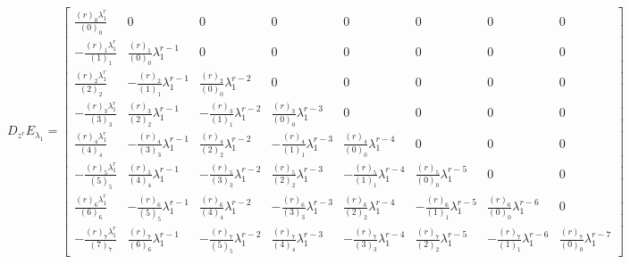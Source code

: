 \iffalse %
\begin{displaymath}
D_{{z}^{r}}E_{\lambda_{1}} = \left[\begin{matrix}\frac{{\left(r\right)}_{0} \lambda_{1}^{r}}{{\left(0\right)}_{0}} & 0 & 0 & 0 & 0 & 0 & 0 & 0\\- \frac{{\left(r\right)}_{1} \lambda_{1}^{r}}{{\left(1\right)}_{1}} & \frac{{\left(r\right)}_{1}}{{\left(0\right)}_{0}} \lambda_{1}^{r - 1} & 0 & 0 & 0 & 0 & 0 & 0\\\frac{{\left(r\right)}_{2} \lambda_{1}^{r}}{{\left(2\right)}_{2}} & - \frac{{\left(r\right)}_{2}}{{\left(1\right)}_{1}} \lambda_{1}^{r - 1} & \frac{{\left(r\right)}_{2}}{{\left(0\right)}_{0}} \lambda_{1}^{r - 2} & 0 & 0 & 0 & 0 & 0\\- \frac{{\left(r\right)}_{3} \lambda_{1}^{r}}{{\left(3\right)}_{3}} & \frac{{\left(r\right)}_{3}}{{\left(2\right)}_{2}} \lambda_{1}^{r - 1} & - \frac{{\left(r\right)}_{3}}{{\left(1\right)}_{1}} \lambda_{1}^{r - 2} & \frac{{\left(r\right)}_{3}}{{\left(0\right)}_{0}} \lambda_{1}^{r - 3} & 0 & 0 & 0 & 0\\\frac{{\left(r\right)}_{4} \lambda_{1}^{r}}{{\left(4\right)}_{4}} & - \frac{{\left(r\right)}_{4}}{{\left(3\right)}_{3}} \lambda_{1}^{r - 1} & \frac{{\left(r\right)}_{4}}{{\left(2\right)}_{2}} \lambda_{1}^{r - 2} & - \frac{{\left(r\right)}_{4}}{{\left(1\right)}_{1}} \lambda_{1}^{r - 3} & \frac{{\left(r\right)}_{4}}{{\left(0\right)}_{0}} \lambda_{1}^{r - 4} & 0 & 0 & 0\\- \frac{{\left(r\right)}_{5} \lambda_{1}^{r}}{{\left(5\right)}_{5}} & \frac{{\left(r\right)}_{5}}{{\left(4\right)}_{4}} \lambda_{1}^{r - 1} & - \frac{{\left(r\right)}_{5}}{{\left(3\right)}_{3}} \lambda_{1}^{r - 2} & \frac{{\left(r\right)}_{5}}{{\left(2\right)}_{2}} \lambda_{1}^{r - 3} & - \frac{{\left(r\right)}_{5}}{{\left(1\right)}_{1}} \lambda_{1}^{r - 4} & \frac{{\left(r\right)}_{5}}{{\left(0\right)}_{0}} \lambda_{1}^{r - 5} & 0 & 0\\\frac{{\left(r\right)}_{6} \lambda_{1}^{r}}{{\left(6\right)}_{6}} & - \frac{{\left(r\right)}_{6}}{{\left(5\right)}_{5}} \lambda_{1}^{r - 1} & \frac{{\left(r\right)}_{6}}{{\left(4\right)}_{4}} \lambda_{1}^{r - 2} & - \frac{{\left(r\right)}_{6}}{{\left(3\right)}_{3}} \lambda_{1}^{r - 3} & \frac{{\left(r\right)}_{6}}{{\left(2\right)}_{2}} \lambda_{1}^{r - 4} & - \frac{{\left(r\right)}_{6}}{{\left(1\right)}_{1}} \lambda_{1}^{r - 5} & \frac{{\left(r\right)}_{6}}{{\left(0\right)}_{0}} \lambda_{1}^{r - 6} & 0\\- \frac{{\left(r\right)}_{7} \lambda_{1}^{r}}{{\left(7\right)}_{7}} & \frac{{\left(r\right)}_{7}}{{\left(6\right)}_{6}} \lambda_{1}^{r - 1} & - \frac{{\left(r\right)}_{7}}{{\left(5\right)}_{5}} \lambda_{1}^{r - 2} & \frac{{\left(r\right)}_{7}}{{\left(4\right)}_{4}} \lambda_{1}^{r - 3} & - \frac{{\left(r\right)}_{7}}{{\left(3\right)}_{3}} \lambda_{1}^{r - 4} & \frac{{\left(r\right)}_{7}}{{\left(2\right)}_{2}} \lambda_{1}^{r - 5} & - \frac{{\left(r\right)}_{7}}{{\left(1\right)}_{1}} \lambda_{1}^{r - 6} & \frac{{\left(r\right)}_{7}}{{\left(0\right)}_{0}} \lambda_{1}^{r - 7}\end{matrix}\right]
\end{displaymath}
